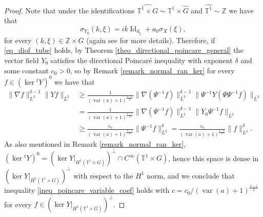 \documentclass[11pt]{amsart}
\numberwithin{theorem}{section}
\numberwithin{equation}{section}
\theoremstyle{definition}
\numberwithin{example}{section}
\theoremstyle{definition}
\theoremstyle{definition}
\newcommand{\Z}{\mathbb{Z}}
\newcommand{\T}{\mathbb{T}}
\begin{document}
\begin{proof}
Note that under the identifications $\widehat{\T^1\times G}\sim \widehat{\T^1}\times \widehat{G}$ and  $\widehat{\T^1}\sim \Z$ we have that 
\begin{equation}\label{eq_symbol_y0}
    \sigma_{Y_0}(k,\xi)=ik\operatorname{Id}_{d_\xi}+a_0\sigma_X(\xi),
\end{equation}
for every $(k,\xi)\in\Z\times G$ (again see \cite{KWR_product} for more details).
Therefore, if \eqref{eq_diof_tube} holds, by Theorem \ref{theo_directional_poincare_general}  the vector field $Y_0$ satisfies the directional Poincaré inequality with exponent $\delta$ and some constant $c_0>0$, so by Remark \ref{remark_normal_ran_ker} for every $f\in (\ker {}^tY)^0$ we have that
\begin{align*}
    \|\nabla f\|_{L^2}^{\delta-1}\|Yf\|_{L^2}&\geq \frac{1}{(\operatorname{var}(a)+1)^{\frac{\delta-1}{2}}}\|\nabla (\Psi^{-1}f)\|_{L^2}^{\delta-1}\|\Psi^{-1}Y(\Psi \Psi ^{-1}f)\|_{L^2}\\
    &=\frac{1}{(\operatorname{var}(a)+1)^{\frac{\delta-1}{2}}}\|\nabla (\Psi^{-1}f)\|_{L^2}^{\delta-1}\|Y_0\Psi^{-1}f\|_{L^2}\\
    &\geq  \frac{c_0}{(\operatorname{var}(a)+1)^{\frac{\delta-1}{2}}}\|\Psi^{-1}f\|_{L^2}^\delta= \frac{c_0}{(\operatorname{var}(a)+1)^{\frac{\delta-1}{2}}}\|f\|_{L^2}^\delta.
\end{align*}
As also mentioned in Remark \ref{remark_normal_ran_ker}, $ (\ker {}^tY)^0= (\ker Y|_{H^1(\T^1\times G)})^\perp\cap C^\infty(\T^1\times G)$,
hence this space is dense in $(\ker Y|_{H^1(\T^1\times G)})^\perp$ with respect to the $H^1$ norm, and we conclude that inequality \eqref{ineq_poincare_variable_coef} holds with $c={c_0}/{(\operatorname{var}(a)+1)^{\frac{\delta-1}{2}}}$ for every $f\in (\ker Y|_{H^1(\T^1\times G)})^\perp$.


\end{proof}
\end{document}
